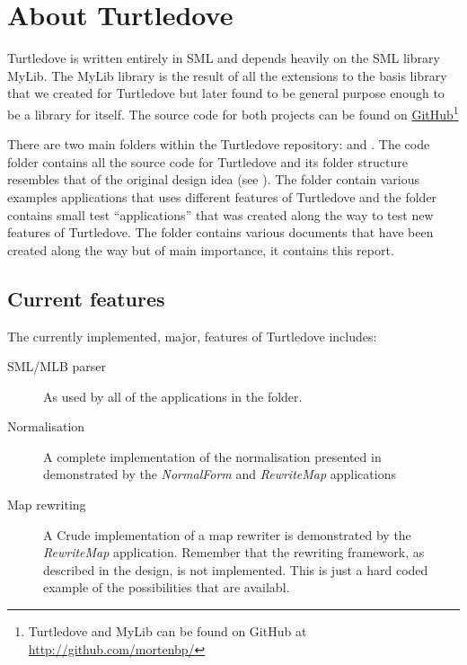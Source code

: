\section{About Turtledove}

Turtledove is written entirely in SML and depends heavily on the SML library
MyLib. The MyLib library is the result of all the extensions to the basis
library that we created for Turtledove but later found to be general purpose
enough to be a library for itself. The source code for both projects can be
found on \href{http://github.com/mortenbp/}{GitHub}\footnote{Turtledove and
  MyLib can be found on GitHub at \url{http://github.com/mortenbp/}}

There are two main folders within the Turtledove repository:  and
. The code folder contains all the source code for Turtledove and
its folder structure resembles that of the original design idea (see
). The  folder contain various examples
applications that uses different features of Turtledove and the 
folder contains small test ``applications'' that was created along the way to
test new features of Turtledove. The  folder contains various
documents that have been created along the way but of main importance, it
contains this report.

\subsection{Current features}

The currently implemented, major, features of Turtledove includes:

\begin{description}
\item[SML/MLB parser] As used by all of the applications in the 
  folder.

\item[Normalisation] A complete implementation of the normalisation presented in
   demonstrated by the \textit{NormalForm} and
  \textit{RewriteMap} applications

\item[Map rewriting] A Crude implementation of a map rewriter is demonstrated by
  the \textit{RewriteMap} application. Remember that the rewriting framework, as
  described in the design, is not implemented. This is just a hard coded example
  of the possibilities that are availabl.
\end{description}


